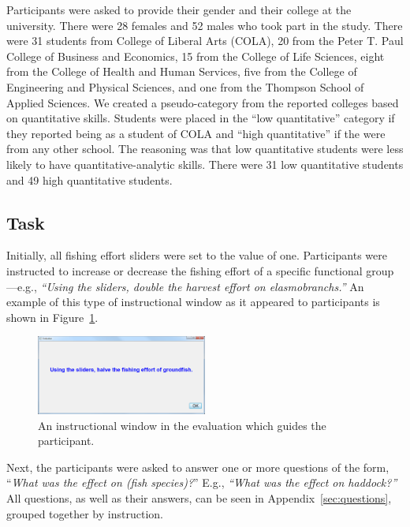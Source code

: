 Participants were asked to provide their gender and their college at the university.  There were 28 females and 52 males who took part in the study.  There were 31 students from College of Liberal Arts (COLA), 20 from the Peter T. Paul College of Business and Economics, 15 from the College of Life Sciences, eight from the College of Health and Human Services, five from the College of Engineering and Physical Sciences, and one from the Thompson School of Applied Sciences.  We created a pseudo-category from the reported colleges based on quantitative skills.  Students were placed in the ``low quantitative'' category if they reported being as a student of COLA and ``high quantitative'' if the were from any other school.  The reasoning was that low quantitative students were less likely to have quantitative-analytic skills.  There were 31 low quantitative students and 49 high quantitative students.

\subsection{Task}

Initially, all fishing effort sliders were set to the value of one.  Participants were instructed to increase or decrease the fishing effort of a specific functional group---e.g., \textit{``Using the sliders, double the harvest effort on elasmobranchs.''}  An example of this type of instructional window as it appeared to participants is shown in Figure~\ref{fig:eval_inst}.

\begin{figure}[h]
	\centering
	\includegraphics[width=0.5\textwidth]{figures/png/eval_instr.png}
	\caption[An instructional window in the evaluation which guides the participant]{An instructional window in the evaluation which guides the participant.}
	\label{fig:eval_inst}
\end{figure}

Next, the participants were asked to answer one or more questions of the form, ``\textit{What was the effect on (fish species)?}''  E.g., \textit{``What was the effect on haddock?''}  All questions, as well as their answers, can be seen in Appendix~\ref{sec:questions}, grouped together by instruction.  %

